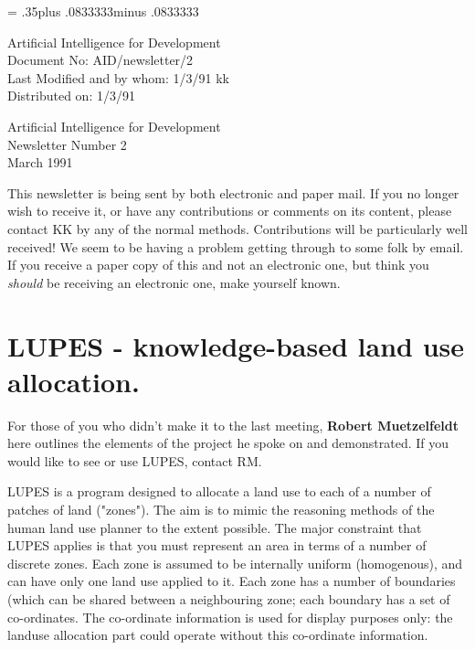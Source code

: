 \pagestyle{myheadings}
\setlength{\textheight}{9in}
\setlength{\topmargin}{0in}
\setlength{\headheight}{.3in}
\setlength{\headsep}{.5in}
\parindent=0pt
\parskip= .35\baselineskip plus .0833333\baselineskip minus .0833333\baselineskip

Artificial Intelligence for Development\\
Document No: AID/newsletter/2\\
Last Modified and by whom: 1/3/91 kk \\
Distributed on:  1/3/91\\
\LARGE
\begin{center} Artificial Intelligence for Development\\
Newsletter Number 2\\March 1991\\
\end{center}
\normalsize

This newsletter is being sent by both electronic and paper mail. If
you no longer wish to receive it, or have any contributions or
comments on its content, please contact KK by any of the normal
methods. Contributions will be particularly well received!
We seem to be having a problem getting through to some folk by email. If you
receive a paper copy of this and not an electronic one, but think you
{\em should} be receiving an electronic one, make yourself known.

\section{ LUPES - knowledge-based land use allocation.}
For those of you who didn't make it to the last meeting, {\bf Robert
Muetzelfeldt} here outlines the elements of the project he spoke on and
demonstrated. If you would like to see or use LUPES, contact RM.

LUPES is a program designed to allocate a land use to each of a number of
patches of land ("zones").   The aim is to mimic the reasoning methods of the
human land use planner to the extent possible.
The major constraint that LUPES applies is that you must represent an area in
terms of a number of discrete zones.   Each zone is assumed to be internally
uniform (homogenous), and can have only one land use applied to it.
Each zone has a number of boundaries (which can be shared between a
neighbouring zone; each boundary has a set of co-ordinates.   The co-ordinate
information is used for display purposes only: the landuse allocation part
could operate without this co-ordinate information.

